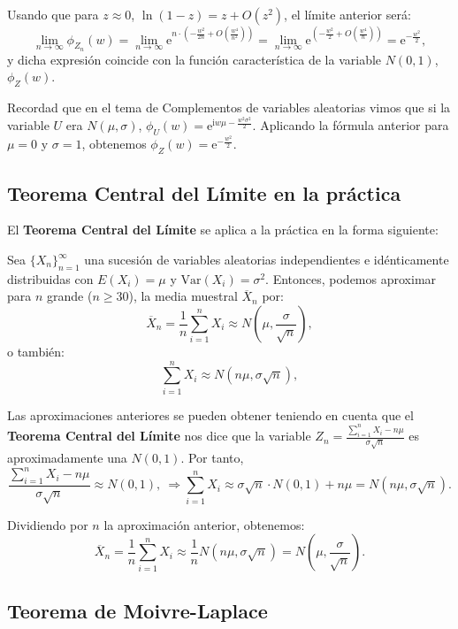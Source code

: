 \documentclass[]{book}
\begin{document}
Usando que para \(z\approx 0\), \(\ln(1-z)=z+O(z^2)\), el límite anterior será:
\[
\lim_{n\to \infty}\phi_{Z_n}(w) = 
\lim_{n\to \infty}\mathrm{e}^{n\cdot \left(-\frac{w^2}{2n}+O\left(\frac{w^4}{n^{2}}\right)\right)} = \lim_{n\to \infty}\mathrm{e}^{ \left(-\frac{w^2}{2}+O\left(\frac{w^4}{n}\right)\right)} = \mathrm{e}^{-\frac{w^2}{2}},
\]
y dicha expresión coincide con la función característica de la variable \(N(0,1)\), \(\phi_{Z}(w)\).

Recordad que en el tema de Complementos de variables aleatorias vimos que si la variable \(U\) era \(N(\mu,\sigma)\), \(\phi_{U}(w)=\mathrm{e}^{\mathrm{i}w\mu-\frac{w^2\sigma^2}{2}}\). Aplicando la fórmula anterior para \(\mu=0\) y \(\sigma=1\), obtenemos \(\phi_{Z}(w)=\mathrm{e}^{-\frac{w^2}{2}}.\)

\hypertarget{teorema-central-del-luxedmite-en-la-pruxe1ctica}{%
\subsection{Teorema Central del Límite en la práctica}\label{teorema-central-del-luxedmite-en-la-pruxe1ctica}}

El \textbf{Teorema Central del Límite} se aplica a la práctica en la forma siguiente:

Sea \(\{X_n\}_{n=1}^\infty\) una sucesión de variables aleatorias independientes e idénticamente distribuidas con \(E(X_i)=\mu\) y \(\mathrm{Var}(X_i)=\sigma^2\). Entonces, podemos aproximar para \(n\) grande (\(n\geq 30\)), la media muestral \(\overline{X}_n\) por:
\[
\overline{X}_n =\frac{1}{n}\sum_{i=1}^n X_i \approx N\left(\mu,\frac{\sigma}{\sqrt{n}}\right),
\]
o también:
\[
\sum_{i=1}^n X_i \approx N\left(n\mu,\sigma\sqrt{n}\right),
\]

Las aproximaciones anteriores se pueden obtener teniendo en cuenta que el \textbf{Teorema Central del Límite} nos dice que la variable
\(Z_n= \frac{\sum\limits_{i=1}^n X_i-n\mu}{\sigma\sqrt{n}}\) es aproximadamente una \(N(0,1)\). Por tanto,
\[
\frac{\sum\limits_{i=1}^n X_i-n\mu}{\sigma\sqrt{n}} \approx N(0,1),\ \Rightarrow \sum_{i=1}^n X_i\approx \sigma\sqrt{n}\cdot N(0,1)+n\mu = N\left(n\mu,\sigma\sqrt{n}\right).
\]

Dividiendo por \(n\) la aproximación anterior, obtenemos:
\[
\overline{X}_n =\frac{1}{n}\sum_{i=1}^n X_i \approx \frac{1}{n}N\left(n\mu,\sigma\sqrt{n}\right) =N\left(\mu,\frac{\sigma}{\sqrt{n}}\right).
\]

\hypertarget{teorema-de-moivre-laplace}{%
\subsection{Teorema de Moivre-Laplace}\label{teorema-de-moivre-laplace}}
\end{document}
